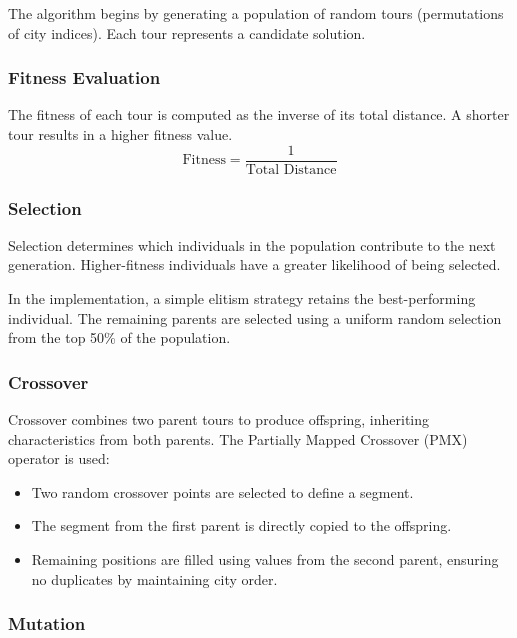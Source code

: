 \documentclass[conference]{IEEEtran}
\begin{document}
The algorithm begins by generating a population of random tours (permutations of city indices). Each tour represents a candidate solution.\\

\subsubsection{Fitness Evaluation}

The fitness of each tour is computed as the inverse of its total distance. A shorter tour results in a higher fitness value.
\begin{equation}
    \text{Fitness} = \frac{1}{\text{Total Distance}}
\end{equation}

\subsubsection{Selection}

Selection determines which individuals in the population contribute to the next generation. Higher-fitness individuals have a greater likelihood of being selected.

In the implementation, a simple elitism strategy retains the best-performing individual. The remaining parents are selected using a uniform random selection from the top 50\% of the population.\\

\subsubsection{Crossover}

Crossover combines two parent tours to produce offspring, inheriting characteristics from both parents. The Partially Mapped Crossover (PMX) operator is used:

\begin{itemize}
    \item Two random crossover points are selected to define a segment.
    \item The segment from the first parent is directly copied to the offspring.
    \item Remaining positions are filled using values from the second parent, ensuring no duplicates by maintaining city order.\\
\end{itemize}

\subsubsection{Mutation}
\end{document}
